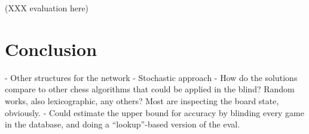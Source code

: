 \documentclass[twocolumn]{amsart}
\begin{document}
(XXX evaluation here)

\section{Conclusion}

- Other structures for the network
- Stochastic approach
- How do the solutions compare to other chess algorithms that
  could be applied in the blind? Random works, also lexicographic,
  any others? Most are inspecting the board state, obviously.
- Could estimate the upper bound for accuracy by blinding every
  game in the database, and doing a ``lookup''-based version of
  the eval.


% 
% 
% 
% 
% 
% 
% 
% 
% 

{}

\end{document}
